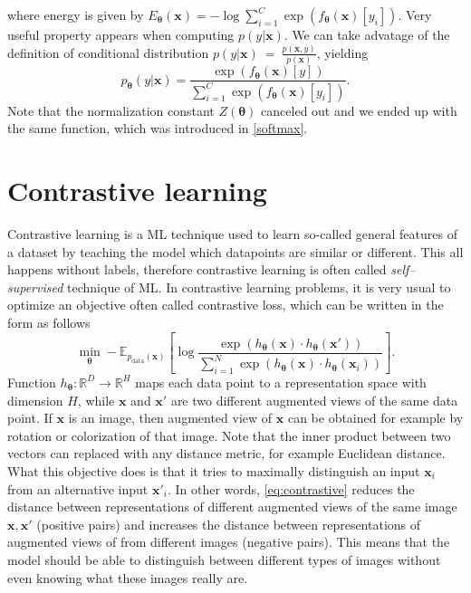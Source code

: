 where energy is given by $E_{\boldsymbol{\theta}}(\boldsymbol{x}) = -\log\sum_{i=1}^C\exp\left({f_{\boldsymbol{\theta}}\left(\boldsymbol{x}\right)[y_i]}\right)$. Very useful property appears when computing $p(y|\boldsymbol{x})$. We can take advatage of the definition of conditional distribution $p(y|\boldsymbol{x})~=~\frac{p\left(\boldsymbol{x},y\right)}{p\left(\boldsymbol{x}\right)}$, yielding  
\begin{equation}\label{softmaxdef}
	p_{\boldsymbol{\theta}}\left(y|\boldsymbol{x}\right) = \frac{\exp\left({f_{\boldsymbol{\theta}}\left(\boldsymbol{x}\right)[y]}\right)}{\sum_{i=1}^C\exp\left({f_{\boldsymbol{\theta}}\left(\boldsymbol{x}\right)[y_i]}\right)}.
\end{equation}
Note that the normalization constant $Z(\boldsymbol{\theta})$ canceled out and we ended up with the same function, which was introduced in \eqref{softmax}. 
\section{Contrastive learning}
 Contrastive learning \cite{contrastive1, contrastive2} is a ML technique used to learn so-called general features of a dataset by teaching the model which datapoints are similar or different. This all happens without labels, therefore contrastive learning is often called \emph{self--supervised} technique of ML.  In contrastive learning problems, it is very usual to optimize an objective often called contrastive loss, which can be written in the form as follows
\begin{equation}\label{eq:contrastive}
	\min_{\boldsymbol{\theta}}- \mathbb{E}_{p_{\mathrm{data}}(\boldsymbol{x})}\left[\log \frac{\exp\left({h_{\boldsymbol{\theta}}\left(\boldsymbol{x}\right)\cdot h_{\boldsymbol{\theta}}\left(\boldsymbol{x}'\right)}\right)}{\sum_{i=1}^N\exp\left({h_{\boldsymbol{\theta}}\left(\boldsymbol{x}\right)\cdot h_{\boldsymbol{\theta}}(\boldsymbol{x}_i) }\right)} \right].
\end{equation}
Function $h_{\boldsymbol{\theta}}: \mathbb{R}^D \to \mathbb{R}^H$ maps each data point to a representation space with dimension $H$, while $\boldsymbol{x}$ and $\boldsymbol{x}'$ are two different augmented views of the same data point. If $\boldsymbol{x}$ is an image, then augmented view of $\boldsymbol{x}$ can be obtained for example by rotation or colorization of that image. Note that the inner product between two vectors can replaced with any distance metric, for example Euclidean distance. \\
What this objective does is that it tries to maximally distinguish an input $\boldsymbol{x}_i$ from an alternative input $\boldsymbol{x}'_i$. In other words, \eqref{eq:contrastive} reduces the distance between representations of different augmented views of the same image $\boldsymbol{x}, \boldsymbol{x}'$ (positive pairs) and increases the distance between representations of augmented views of from different images (negative pairs). This means that the model should be able to distinguish between different types of images without even knowing what these images really are. 



